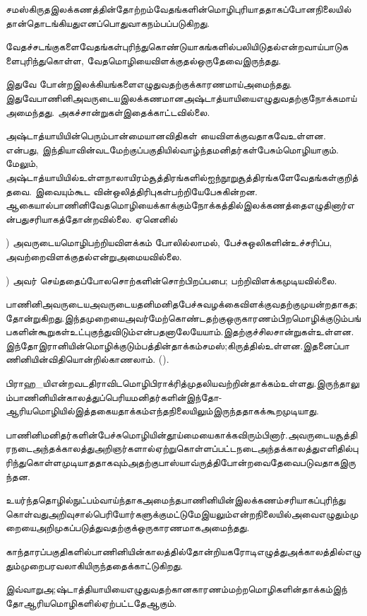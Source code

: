 சமஸ்கிருதஇலக்கணத்தின்தோற்றம்வேதங்களின்மொழிபுரியாததாகப்போனநிலையில்தான்தொடங்கியதுஎனப்பொதுவாகநம்பப்படுகிறது. 

வேதச்சடங்குகளைவேதங்கள்புரிந்துகொண்டுயாகங்களில்பலியிடுதல்என்றவாய்பாடுகளைபுரிந்துகொள்ள, வேதமொழியைவிளக்குதல்ஒருதேவைஇருந்தது. 

இதுவே  போன்றஇலக்கியங்களைஎழுதுவதற்குக்காரணமாய்அமைந்தது. இதுவேபாணினிஅவருடையஇலக்கணமானஅஷ்டாத்யாயியைஎழுதுவதற்குநோக்கமாய்அமைந்தது. அகச்சான்றுகள்இதைக்காட்டவில்லை. 

அஷ்டாத்யாயியின்பெரும்பான்மையானவிதிகள்  யைவிளக்குவதாகவேஉள்ளன.  என்பது, இந்தியாவின்வடமேற்குப்பகுதியில்வாழ்ந்தமனிதர்கள்பேசும்மொழியாகும். மேலும், அஷ்டாத்யாயியில்உள்ளநாலாயிரம்சூத்திரங்களில்ஐந்நூறுசூத்திரங்களேவேதங்கள்குறித்தவை. இவையும்கூட  வின்ஒலித்திரிபுகள்பற்றியேபேசுகின்றன. ஆகையால்பாணினிவேதமொழியைக்காக்கும்நோக்கத்தில்இலக்கணத்தைஎழுதினார்என்பதுசரியாகத்தோன்றவில்லை. ஏனெனில் 

) அவருடையமொழிபற்றியவிளக்கம்  போலில்லாமல், பேச்சுஒலிகளின்உச்சரிப்ப, அவற்றைவிளக்குதல்என்றுஅமையவில்லை. 

) அவர்  செய்ததைப்போலசொற்களின்சொற்பிறப்பபை; பற்றிவிளக்கமுடியவில்லை.

பாணினிஅவருடையஅவருடையதனிமனிதபேச்சுவழக்கைவிளக்குவதற்குமுயன்றதாகத;தோன்றுகிறது.இந்தமுறையைஅவர்மேற்கொண்டதற்குஒருகாரணம்பிறமொழிக்குடும்பங்பகளின்கூறுகள்உட்புகுந்துவிடும்என்பதனாலேயேயாம்.இதற்குச்சிலசான்றுகள்உள்ளன.இந்தோஇரானியின்மொழிக்குடும்பத்தின்தாக்கம்சமஸ்;கிருத்தில்உள்ளன.இதனைப்பாணினியின்விதியொன்றில்காணலாம். ().

 பிராஹ\_யிஎன்றவடதிராவிடமொழிபிராக்ரித்முதலியவற்றின்தாக்கம்உள்ளது.இருந்தாலும்பாணினியின்காலத்துப்பெரியமனிதர்களின்இந்தோ-ஆரியமொழியில்இத்தகையதாக்கம்எந்தநிலையிலும்இருந்ததாகக்கூறமுடியாது. 

பாணினிமனிதர்களின்பேச்சுமொழியின்தூய்மையைகாக்கவிரும்பினார்.அவருடையசூத்திரநடைஅந்தக்காலத்துஅறிஞர்களால்ஏற்றுகொள்ளப்பட்டநடைஅந்தக்காலத்துஎளிதில்புரிந்துகொள்ளமுடியாததாகவும்அதற்குபாஸ்யாவ்ருத்திபோன்றவைதேவைபடுவதாகஇருந்தன.

 உயர்ந்ததொழில்நுட்பம்வாய்ந்தாகஅமைந்தபாணினியின்இலக்கணம்சரியாகப்புரிந்துகொள்வதுஅறிவுசால்பெரியோர்களுக்குமட்டுமேஇயலும்என்றநிலையில்அவைஎழுதும்முறையைஅறிமுகப்படுத்துவதற்குக்ஒருகாரணமாகஅமைந்தது.

காந்தாரப்பகுதிகளில்பாணினியின்காலத்தில்தோன்றியகரோடிஎழுத்துஅக்காலத்தில்எழுதும்முறைபரவலாகியிருந்ததைக்காட்டுகிறது. 

இவ்வாறுஅ;ஷ்டாத்தியாயியைஎழுதுவதற்கானகாரணம்மற்றமொழிகளின்தாக்கம்இந்தோஆரியமொழிகளில்ஏற்பட்டதேஆகும்.

